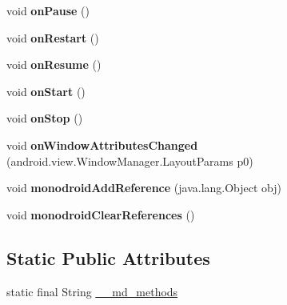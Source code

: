 \begin{DoxyCompactItemize}
void {\bfseries on\+Pause} ()
\item 
\mbox{\label{classmd5b60ffeb829f638581ab2bb9b1a7f4f3f_1_1_forms_app_compat_activity_ae6ef92a90ed2b3b497cde38bd2024062}} 
void {\bfseries on\+Restart} ()
\item 
\mbox{\label{classmd5b60ffeb829f638581ab2bb9b1a7f4f3f_1_1_forms_app_compat_activity_a5509346859968983835eee71f02ddcee}} 
void {\bfseries on\+Resume} ()
\item 
\mbox{\label{classmd5b60ffeb829f638581ab2bb9b1a7f4f3f_1_1_forms_app_compat_activity_a919da8f4e7a50367d94fed82c31fd49a}} 
void {\bfseries on\+Start} ()
\item 
\mbox{\label{classmd5b60ffeb829f638581ab2bb9b1a7f4f3f_1_1_forms_app_compat_activity_a249966d126a906167db3ac7d026675c5}} 
void {\bfseries on\+Stop} ()
\item 
\mbox{\label{classmd5b60ffeb829f638581ab2bb9b1a7f4f3f_1_1_forms_app_compat_activity_a94568ca372a2589ad853d67c5b1d1a71}} 
void {\bfseries on\+Window\+Attributes\+Changed} (android.\+view.\+Window\+Manager.\+Layout\+Params p0)
\item 
\mbox{\label{classmd5b60ffeb829f638581ab2bb9b1a7f4f3f_1_1_forms_app_compat_activity_a1389ec337c7200cacb878f5e3c5b946c}} 
void {\bfseries monodroid\+Add\+Reference} (java.\+lang.\+Object obj)
\item 
\mbox{\label{classmd5b60ffeb829f638581ab2bb9b1a7f4f3f_1_1_forms_app_compat_activity_a8a2a2c0fe41e592284f243d8b007ecd0}} 
void {\bfseries monodroid\+Clear\+References} ()
\end{DoxyCompactItemize}
\subsection*{Static Public Attributes}
\begin{DoxyCompactItemize}
\item 
static final String \hyperlink{classmd5b60ffeb829f638581ab2bb9b1a7f4f3f_1_1_forms_app_compat_activity_a2cb4fae3ad0f7b38c85c94c344df5089}{\+\_\+\+\_\+md\+\_\+methods}
\end{DoxyCompactItemize}


